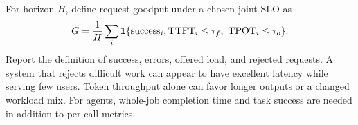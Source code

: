 For horizon $H$, define request goodput under a chosen joint SLO as
\begin{equation}
 G=\frac{1}{H}\sum_i\mathbf{1}\{\mathrm{success}_i,
 \mathrm{TTFT}_i\le\tau_f,\ \mathrm{TPOT}_i\le\tau_o\}.
 \label{eq:goodput}
\end{equation}
Report the definition of success, errors, offered load, and rejected requests.
A system that rejects difficult work can appear to have excellent latency while
serving few users. Token throughput alone can favor longer outputs or a changed
workload mix. For agents, whole-job completion time and task success are needed
in addition to per-call metrics.
